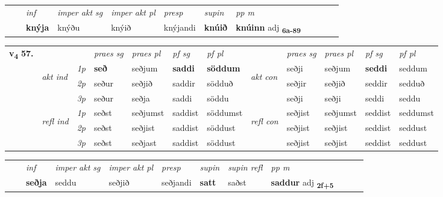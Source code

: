 \begin{tabular}{llllllllllll}
 & & \textit{inf} & \textit{imper akt sg} & \textit{imper akt pl}   & \textit{presp} & \textit{supin}  & \textit{pp m}     \\*
  & & \textbf{knýja} & knýðu  & knýið   & knýjandi &  \textbf{knúið}  & \textbf{knúinn} adj \textbf{\textsubscript{6a-89}} \\*
\cmidrule{1-12}
\end{tabular}



\begin{tabular}{llllllllllll} \toprule
\multirow{4}{*}{{{\textbf{v{\textsubscript{4}}} \Large{\textbf{57.}}}}}  & &   &  \textit{praes sg}  & \textit{praes pl}  &\textit{ pf sg} & \textit{pf pl} &  &  \textit{praes sg}  & \textit{praes pl}  & \textit{pf sg} & \textit{pf pl } \\*
	\cmidrule{4-7} \cmidrule{9-12}
 & \multirow{3}{*}{\begin{turn}{90}\textit{akt ind}\end{turn}} & {\textit{1p}} & \textbf{seð} & seðjum    & \textbf{saddi} & \textbf{söddum} & \multirow{3}{*}{\begin{turn}{90}\textit{akt con}\end{turn}} &seðji & seðjum & \textbf{seddi} & seddum\\*
& &  {\textit{2p}} &  seður  & seðjið   & saddir & södduð & & seðjir & seðjið & seddir & sedduð \\*
& &  {\textit{3p}} & seður & seðja   & saddi & söddu & & seðji & seðji& seddi & seddu  \\*
\cmidrule{4-7} \cmidrule{9-12}
 &\multirow{3}{*}{\begin{turn}{90}\textit{refl ind}\end{turn}} & {\textit{1p}} & seðst & seðjumst    & saddist & söddumst & \multirow{3}{*}{\begin{turn}{90}\textit{refl con}\end{turn}}  &seðjist & seðjumst & seddist & seddumst\\*
 &&  {\textit{2p}} &  seðst  & seðjist   & saddist & söddust & &seðjist & seðjist & seddist & seddust \\*
& &  {\textit{3p}} & seðst & seðjast   & saddist & söddust & & seðjist & seðjist& seddist & seddust  \\*
\cmidrule{4-7} \cmidrule{9-12}
\end{tabular}


\begin{tabular}{llllllllllll}
 & & \textit{inf} & \textit{imper akt sg} & \textit{imper akt pl}   & \textit{presp} & \textit{supin} & \textit{supin refl} & \textit{pp m}     \\*
  & & \textbf{seðja} & seddu  & seðjið   & seðjandi &  \textbf{satt} & saðst & \textbf{saddur} adj \textbf{\textsubscript{2f+5}} \\*
\cmidrule{1-12}
\end{tabular}



